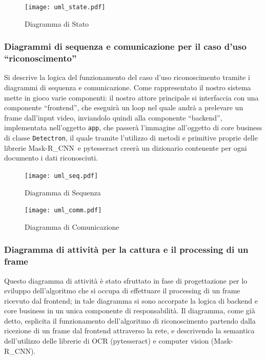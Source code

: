 \documentclass[12pt,a4paper]{article}
\newcommand{\mrcnn}{Mask-R\_CNN}
\begin{document}
\begin{figure}[H]
    \caption{Diagramma di Stato}
    \centering
    \texttt{[image: uml\_state.pdf]}
\end{figure}

\subsubsection{Diagrammi di sequenza e comunicazione per il caso d'uso ``riconoscimento''}

Si descrive la logica del funzionamento del caso d'uso riconoscimento
tramite i diagrammi di sequenza e comunicazione. Come rappresentato il
nostro sistema mette in gioco varie componenti: il nostro attore
principale si interfaccia con una componente ``frontend'', che eseguirà
un loop nel quale andrà a prelevare un frame dall'input video,
inviandolo quindi alla componente ``backend'', implementata nell'oggetto
\texttt{app}, che passerà l'immagine all'oggetto di core business di
classe \texttt{Detectron}, il quale tramite l'utilizzo di metodi e
primitive proprie delle librerie \mrcnn\ e pytesseract creerà un
dizionario contenente per ogni documento i dati riconosciuti.

\begin{figure}[H]
    \caption{Diagramma di Sequenza}
    \centering
    \texttt{[image: uml\_seq.pdf]}
\end{figure}

\begin{figure}[H]
    \caption{Diagramma di Comunicazione}
    \centering
    \texttt{[image: uml\_comm.pdf]}
\end{figure}

\subsubsection{Diagramma di attività per la cattura e il processing di un frame}

Questo diagramma di attività è stato sfruttato in fase di progettazione
per lo sviluppo dell'algoritmo che si occupa di effettuare il processing
di un frame ricevuto dal frontend; in tale diagramma si sono accorpate
la logica di backend e core business in un unica componente di
responsabilità. Il diagramma, come già detto, esplicita il funzionamento
dell'algoritmo di riconoscimento partendo dalla ricezione di un frame
dal frontend attraverso la rete, e descrivendo la semantica
dell'utilizzo delle librerie di OCR (pytesseract) e computer vision
(\mrcnn).
\end{document}
